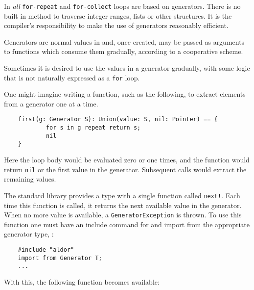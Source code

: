 In \asharp{} {\em all} {\tt for-repeat} and {\tt for-collect} loops
are based on generators.
There is no built in method to traverse integer ranges, lists or other
structures. 
It is the compiler's responsibility to make the use
of generators reasonably efficient. 

Generators are normal values in \asharp{} and, once created, may be
passed as arguments to functions which consume them gradually, according
to a cooperative scheme.


Sometimes it is desired to use the values in a generator gradually,
with some logic that is not naturally expressed as a \verb"for" loop.

One might imagine writing a function, such as the following, to extract
elements from a generator one at a time.

\begin{small}
\begin{verbatim}
    first(g: Generator S): Union(value: S, nil: Pointer) == {
            for s in g repeat return s;
            nil
    }
\end{verbatim}
\end{small}
Here the loop body would be evaluated zero or one times, and the function
would return \verb"nil" or the first value in the generator.
Subsequent calls would extract the remaining values.

The standard \asharp{} library provides a type with a single function
called {\tt next!}. Each time this function is called, it returns the
next available value in the generator. When no more value is available,
a {\tt GeneratorException} is thrown.
To use this function one must have an include command for \libaldor{}
and import from the appropriate generator type, \eg{}:

\begin{small}
\begin{verbatim}
    #include "aldor"
    import from Generator T;
    ...
\end{verbatim}
\end{small}
With this, the following function becomes available:

